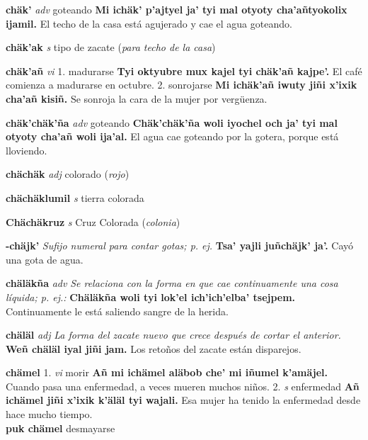 \documentclass[10pt]{scrbook}
\newcommand{\entry}[1]{\textbf{#1}}
\newcommand{\onedefinition}[1]{#1.}
\newcommand{\nontranslationdef}[1]{\textit{#1}}
\newcommand{\partofspeech}[1]{\textit{#1}}
\newcommand{\spanishtranslation}[1]{#1}
\newcommand{\clarification}[1]{(\textit{#1})}
\newcommand{\cholexample}[1]{\textbf{#1}}
\newcommand{\exampletranslation}[1]{#1}
\newcommand{\secondaryentry}[1]{\\\textbf{#1}}
\newcommand{\secondtranslation}[1]{#1}
\begin{document}
\begin{multicols}{2}
\entry{chäk'}
\partofspeech{adv}
\spanishtranslation{goteando}
\cholexample{Mi ichäk' p'ajtyel ja' tyi mal otyoty cha'añtyokolix ijamil.}
\exampletranslation{El techo de la casa está agujerado y cae el agua goteando.}

\entry{chäk'ak}
\partofspeech{s}
\spanishtranslation{tipo de zacate}
\clarification{para techo de la casa}

\entry{chäk'añ}
\partofspeech{vi}
\onedefinition{1}
\spanishtranslation{madurarse}
\cholexample{Tyi oktyubre mux kajel tyi chäk'añ kajpe'.}
\exampletranslation{El café comienza a madurarse en octubre.}
\onedefinition{2}
\spanishtranslation{sonrojarse}
\cholexample{Mi ichäk'añ iwuty jiñi x'ixik cha'añ kisiñ.}
\exampletranslation{Se sonroja la cara de la mujer por vergüenza.}

\entry{chäk'chäk'ña}
\partofspeech{adv}
\spanishtranslation{goteando}
\cholexample{Chäk'chäk'ña woli iyochel och ja' tyi mal otyoty cha'añ woli ija'al.}
\exampletranslation{El agua cae goteando por la gotera, porque está lloviendo.}

\entry{chächäk}
\partofspeech{adj}
\spanishtranslation{colorado}
\clarification{rojo}

\entry{chächäklumil}
\partofspeech{s}
\spanishtranslation{tierra colorada}

\entry{Chächäkruz}
\partofspeech{s}
\spanishtranslation{Cruz Colorada}
\clarification{colonia}

\entry{-chäjk'}
\nontranslationdef{Sufijo numeral para contar gotas; p. ej.}
\cholexample{Tsa' yajli juñchäjk' ja'.}
\exampletranslation{Cayó una gota de agua.}

\entry{chäläkña}
\partofspeech{adv}
\nontranslationdef{Se relaciona con la forma en que cae continuamente una cosa líquida; p. ej.:}
\cholexample{Chäläkña woli tyi lok'el ich'ich'elba' tsejpem.}
\exampletranslation{Continuamente le está saliendo sangre de la herida.}

\entry{chäläl}
\partofspeech{adj}
\nontranslationdef{La forma del zacate nuevo que crece después de cortar el anterior.}
\cholexample{Weñ chäläl iyal jiñi jam.}
\exampletranslation{Los retoños del zacate están disparejos.}

\entry{chämel}
\onedefinition{1}
\partofspeech{vi}
\spanishtranslation{morir}
\cholexample{Añ mi ichämel aläbob che' mi iñumel k'amäjel.}
\exampletranslation{Cuando pasa una enfermedad, a veces mueren muchos niños.}
\onedefinition{2}
\partofspeech{s}
\spanishtranslation{enfermedad}
\cholexample{Añ ichämel jiñi x'ixik k'äläl tyi wajali.}
\exampletranslation{Esa mujer ha tenido la enfermedad desde hace mucho tiempo.}
\secondaryentry{puk chämel}
\secondtranslation{desmayarse}


\end{multicols}
\end{document}
